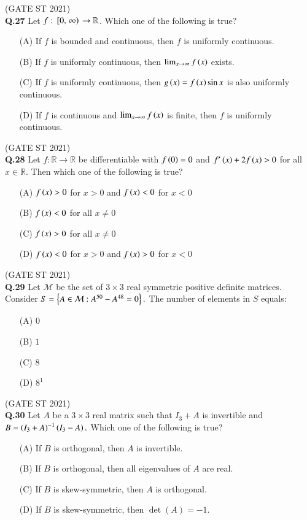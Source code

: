 \documentclass[journal,12pt,onecolumn]{IEEEtran}
\theoremstyle{remark}
\begin{document}
\hfill (GATE ST 2021) \\

\textbf{Q.27}
Let $f: {}\left[0, \left.\infty\right)\right. \to \mathbb{R}$. Which one of the following is true?
\begin{enumerate}
\item[(A)] If $f$ is bounded and continuous, then $f$ is uniformly continuous.
\item[(B)] If $f$ is uniformly continuous, then $\lim_{x \to \infty} f\left(x\right)$ exists.
\item[(C)] If $f$ is uniformly continuous, then $g\left(x\right) = f\left(x\right) \sin x$ is also uniformly continuous.
\item[(D)] If $f$ is continuous and $\lim_{x \to \infty} f\left(x\right)$ is finite, then $f$ is uniformly continuous.
\end{enumerate}

\hfill (GATE ST 2021) \\
\textbf{Q.28}
Let $f: \mathbb{R} \to \mathbb{R}$ be differentiable with $f\left(0\right) = 0$ and $f'\left(x\right) + 2f\left(x\right) > 0$ for all $x \in \mathbb{R}$. Then which one of the following is true?
\begin{enumerate}
\item[(A)] $f\left(x\right) > 0$ for $x > 0$ and $f\left(x\right) < 0$ for $x < 0$
\item[(B)] $f\left(x \right)< 0$ for all $x \neq 0$
\item[(C)] $f\left(x\right) > 0$ for all $x \neq 0$
\item[(D)] $f\left(x\right) < 0$ for $x > 0$ and $f\left(x\right) > 0$ for $x < 0$
\end{enumerate}

\hfill (GATE ST 2021) \\
\textbf{Q.29}
Let $\mathcal{M}$ be the set of $3\times 3$ real symmetric positive definite matrices. Consider  
$
S = \left\{ A \in \mathcal{M} : A^{50} - A^{48} = 0 \right\}.
$
The number of elements in $S$ equals:
\begin{enumerate}
\item[(A)] $0$
\item[(B)] $1$
\item[(C)] $8$
\item[(D)] $8^1$
\end{enumerate}

\hfill (GATE ST 2021) \\

\textbf{Q.30}
Let $A$ be a $3\times 3$ real matrix such that $I_3 + A$ is invertible and
$
B = \left(I_3 + A\right)^{-1}\left(I_3 - A\right).
$
Which one of the following is true?
\begin{enumerate}
\item[(A)] If $B$ is orthogonal, then $A$ is invertible.
\item[(B)] If $B$ is orthogonal, then all eigenvalues of $A$ are real.
\item[(C)] If $B$ is skew-symmetric, then $A$ is orthogonal.
\item[(D)] If $B$ is skew-symmetric, then $\det(A) = -1$.
\end{enumerate}
\end{document}
